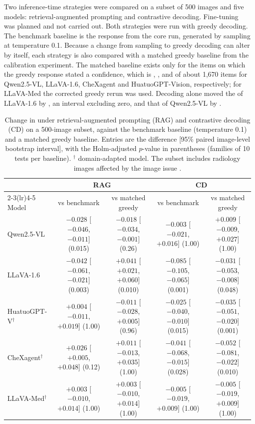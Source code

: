 Two inference-time strategies were compared on a subset of 500 images and five models: retrieval-augmented prompting and contrastive decoding. Fine-tuning was planned and not carried out. Both strategies were run with greedy decoding. The benchmark baseline is the response from the core run, generated by sampling at temperature 0.1. Because a change from sampling to greedy decoding can alter \SMHR{} by itself, each strategy is also compared with a matched greedy baseline from the calibration experiment. The matched baseline exists only for the items on which the greedy response stated a confidence, which is , ,  and  of about 1,670 items for Qwen2.5-VL, LLaVA-1.6, CheXagent and HuatuoGPT-Vision, respectively; for LLaVA-Med the corrected greedy rerun was used. Decoding alone moved the \SMHR{} of LLaVA-1.6 by , an interval excluding zero, and that of Qwen2.5-VL by .

\begin{table}[t]
\centering
\footnotesize
\caption{Change in \SMHR{} under retrieval-augmented prompting (RAG) and contrastive decoding (CD) on a 500-image subset, against the benchmark baseline (temperature 0.1) and a matched greedy baseline. Entries are the difference [95\% paired image-level bootstrap interval], with the Holm-adjusted $p$-value in parentheses (families of 10 tests per baseline). $^{\dagger}$ domain-adapted model. The subset includes radiology images affected by the image issue \rad{}.}
\label{tab:mitigation}
\begin{tabular}{@{}lcccc@{}}
\toprule
& \multicolumn{2}{c}{RAG} & \multicolumn{2}{c}{CD} \\
\cmidrule(lr){2-3}\cmidrule(lr){4-5}
Model & vs benchmark & vs matched greedy & vs benchmark & vs matched greedy \\
\midrule
Qwen2.5-VL & $-0.028$ [$-0.046$, $-0.011$] (0.015) & $-0.018$ [$-0.034$, $-0.001$] (0.26) & $-0.003$ [$-0.021$, $+0.016$] (1.00) & $+0.009$ [$-0.009$, $+0.027$] (1.00) \\
LLaVA-1.6 & $-0.042$ [$-0.061$, $-0.021$] (0.003) & $+0.041$ [$+0.021$, $+0.060$] (0.010) & $-0.085$ [$-0.105$, $-0.065$] (0.001) & $-0.031$ [$-0.053$, $-0.008$] (0.048) \\
HuatuoGPT-V$^{\dagger}$ & $+0.004$ [$-0.011$, $+0.019$] (1.00) & $-0.011$ [$-0.028$, $+0.005$] (0.96) & $-0.025$ [$-0.040$, $-0.010$] (0.015) & $-0.035$ [$-0.051$, $-0.020$] (0.001) \\
CheXagent$^{\dagger}$ & $+0.026$ [$+0.005$, $+0.048$] (0.12) & $+0.011$ [$-0.013$, $+0.035$] (1.00) & $-0.041$ [$-0.068$, $-0.015$] (0.028) & $-0.052$ [$-0.081$, $-0.022$] (0.010) \\
LLaVA-Med$^{\dagger}$ & $+0.003$ [$-0.010$, $+0.014$] (1.00) & $+0.003$ [$-0.010$, $+0.014$] (1.00) & $-0.005$ [$-0.019$, $+0.009$] (1.00) & $-0.005$ [$-0.019$, $+0.009$] (1.00) \\
\bottomrule
\end{tabular}
\end{table}

